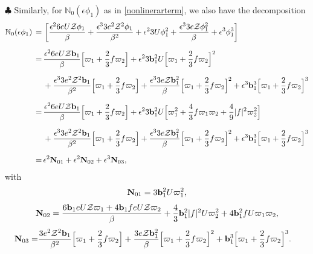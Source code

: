 \documentclass[10pt, reqno]{amsart}
\numberwithin{equation}{section}
\theoremstyle{definition}
\begin{document}
{{\smallskip\noindent $\clubsuit$
Similarly, for $\mathbb{N}_0(\epsilon\phi_1)$ as in \eqref{nonlinerarterm}, we also have the decomposition
\begin{align}\label{decompose N0}
 \mathbb{N}_0(\epsilon\phi_1)
\,=\,&
 \left[ \frac{\epsilon^26e U\mathcal Z \phi_1}{\beta}
 +\frac{\epsilon^3 3 e^2\mathcal Z^2 \phi_1}{\beta^2}
 +\epsilon^2 3 U \phi_{1}^2
 +\frac{\epsilon^3 3 e{\mathcal Z} \phi_{1}^2}{\beta}
 +\epsilon^3 \phi_{1}^3\right]
\nonumber\\[2mm]
\,=\,&
\frac{\epsilon^2 6 e U{\mathcal Z} {\mathbf b}_1}\beta\Big[\varpi_1 + \frac{2}{3}f\varpi_2\Big]
+
\epsilon^2 3 {\mathbf b}_1^2U\Big[\varpi_1 + \frac{2}{3} f\varpi_2\Big]^2
\nonumber\\[2mm]
&
+
\frac{\epsilon^3 3 e^2\mathcal Z^2 {\mathbf b}_1}{\beta^2}\Big[\varpi_1 + \frac{2}{3} f\varpi_2\Big]
+
\frac{\epsilon^3 3 e{\mathcal Z} {\mathbf b}_1^2}{\beta}\Big[\varpi_1 + \frac{2}{3} f\varpi_2\Big]^2
+
\epsilon^3 {\mathbf b}_1^3\Big[\varpi_1 + \frac{2}{3}f\varpi_2\Big]^3
\nonumber\\[2mm]
\,=\,&
\frac{\epsilon^2 6 e U{\mathcal Z} {\mathbf b}_1}\beta\Big[\varpi_1 + \frac{2}{3}f\varpi_2 \Big]
+ \epsilon^2 3 {\mathbf b}_1^2U\Big[\varpi_1^2+\frac{4}{3}f \varpi_1\varpi_2+\frac{4}{9}|f|^2 \varpi_2^2 \Big]
\nonumber\\[2mm]
&
+ \frac{\epsilon^3 3 e^2\mathcal Z^2 {\mathbf b}_1}{\beta^2}\Big[\varpi_1 + \frac{2}{3}f \varpi_2\Big]
 + \frac{\epsilon^3 3 e{\mathcal Z} {\mathbf b}_1^2}{\beta}\Big[\varpi_1 + \frac{2}{3} f \varpi_2\Big]^2
 +\epsilon^3 {\mathbf b}_1^3\Big[\varpi_1 + \frac{2}{3}f\varpi_2\Big]^3
\nonumber\\[2mm]
\,=\,&\epsilon^2 {\bf N}_{01}+\epsilon^2 {\bf N}_{02}+\epsilon^3{\bf N}_{03},
\end{align}
with
\begin{align}\label{N01}
{\bf N}_{01} = 3{\mathbf b}_1^2U\varpi_1^2,
\end{align}
\begin{align}\label{N02}
{\bf N}_{02} =
\frac{6 {\mathbf b}_1e U{\mathcal Z}\varpi_1
+4 {\mathbf b}_1fe U{\mathcal Z} \varpi_2}\beta
+\frac{4}{3}{\mathbf b}_1^2|f|^2 U\varpi_2^2
+ 4{\mathbf b}_1^2f U\varpi_1\varpi_2,
\end{align}
\begin{align}\label{N03}
{\bf N}_{03} =&
\frac{3 e^2\mathcal Z^2 {\mathbf b}_1}{\beta^2}\Big[\varpi_1 + \frac{2}{3}f \varpi_2\Big]
+ \frac{3 e{\mathcal Z} {\mathbf b}_1^2}{\beta}\Big[\varpi_1 + \frac{2}{3}f \varpi_2\Big]^2
+ {\mathbf b}_1^3\Big[\varpi_1 + \frac{2}{3}f \varpi_2\Big]^3.
\end{align}


}}
\end{document}
